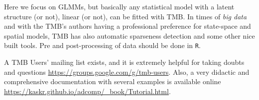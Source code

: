 Here we focus on GLMMs, but basically any statistical model with a
latent structure (or not), linear (or not), can be fitted with TMB. In
times of \textit{big data} and with the TMB's authors having a
professional preference for state-space and spatial models, TMB has also
automatic sparseness detection and some other nice built tools. Pre and
post-processing of data should be done in \texttt{R}.

A TMB Users' mailing list exists, and it is extremely helpful for taking
doubts and questions \url{https://groups.google.com/g/tmb-users}. Also,
a very didactic and comprehensive documentation with several examples is
available online
\url{https://kaskr.github.io/adcomp/_book/Tutorial.html}.

